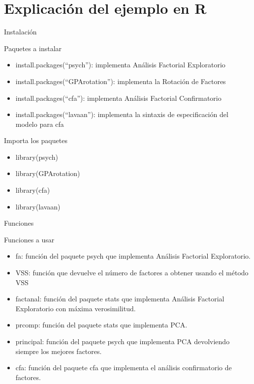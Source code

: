 \documentclass[10pt]{beamer}
\begin{document}
\section{Explicación del ejemplo en R}

\begin{frame}[fragile]{Instalación}
	\vspace{10px}
	\begin{block}{Paquetes a instalar}
		\begin{itemize}
			\item install.packages(``psych''): implementa Análisis Factorial Exploratorio
			\item install.packages(``GPArotation''): implementa la Rotación de Factores
			\item install.packages(``cfa''): implementa Análisis Factorial Confirmatorio
			\item install.packages(``lavaan''): implementa la sintaxis de especificación del modelo para cfa
		\end{itemize}
	\end{block}
	\vspace{10px}
	\begin{alertblock}{Importa los paquetes}
		\begin{itemize}
			\item library(psych)
			\item library(GPArotation)
			\item library(cfa)
			\item library(lavaan)
		\end{itemize}
	\end{alertblock}
\end{frame}

\begin{frame}[fragile]{Funciones}
\vspace{10px}
\begin{block}{Funciones a usar}
	\begin{itemize}
		\item fa: función del paquete psych que implementa Análisis Factorial Exploratorio.
		\item VSS: función que devuelve el número de factores a obtener usando el método VSS
		\item factanal: función del paquete stats que implementa Análisis Factorial Exploratorio con máxima verosimilitud.
		\item prcomp: función del paquete stats que implementa PCA.
		\item principal: función del paquete psych que implementa PCA devolviendo siempre los mejores factores.
		\item cfa: función del paquete cfa que implementa el análisis confirmatorio de factores.
	\end{itemize}
\end{block}
\end{frame}
\end{document}
